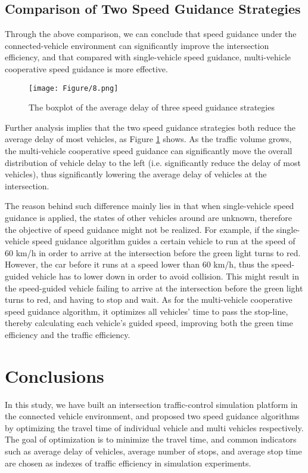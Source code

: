 \documentclass[10.5pt,compsoc]{TsT}
\theoremstyle{mystyle}
\begin{document}
{\subsection{Comparison of Two Speed Guidance Strategies}
Through the above comparison, we can conclude that speed guidance under
the connected-vehicle environment can significantly improve the
intersection efficiency, and that compared with single-vehicle speed
guidance, multi-vehicle cooperative speed guidance is more effective.

\begin{figure}[H]
\centering
\texttt{[image: Figure/8.png]}
\caption{The boxplot of the average delay of three speed guidance
strategies}
\label{Figure 8} 
\end{figure}

Further analysis implies that the two speed guidance strategies both
reduce the average delay of most vehicles, as Figure \ref{Figure 8} shows. As the
traffic volume grows, the multi-vehicle cooperative speed guidance can
significantly move the overall distribution of vehicle delay to the left
(i.e. significantly reduce the delay of most vehicles), thus
significantly lowering the average delay of vehicles at the
intersection.

The reason behind such difference mainly lies in that when
single-vehicle speed guidance is applied, the states of other vehicles
around are unknown, therefore the objective of speed guidance might not
be realized. For example, if the single-vehicle speed guidance algorithm
guides a certain vehicle to run at the speed of 60 km/h in order to
arrive at the intersection before the green light turns to red. However,
the car before it runs at a speed lower than 60 km/h, thus the
speed-guided vehicle has to lower down in order to avoid collision. This
might result in the speed-guided vehicle failing to arrive at the
intersection before the green light turns to red, and having to stop and
wait. As for the multi-vehicle cooperative speed guidance algorithm, it
optimizes all vehicles' time to pass the stop-line, thereby calculating
each vehicle's guided speed, improving both the green time efficiency
and the traffic efficiency.

\section{Conclusions}
\noindent
In this study, we have built an intersection traffic-control simulation
platform in the connected vehicle environment, and proposed two speed
guidance algorithms by optimizing the travel time of individual vehicle
and multi vehicles respectively. The goal of optimization is to minimize
the travel time, and common indicators such as average delay of
vehicles, average number of stops, and average stop time are chosen as
indexes of traffic efficiency in simulation experiments.

}
\end{document}
